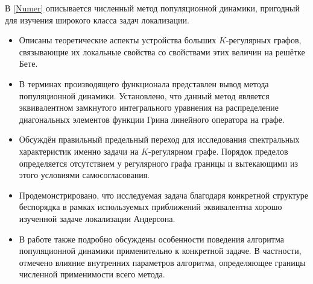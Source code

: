 В \autoref{Numer} описывается численный метод популяционной динамики, пригодный для изучения широкого класса задач локализации. 
\begin{itemize}
	\item Описаны теоретические аспекты устройства больших $K$-регулярных графов, связывающие их локальные свойства со свойствами этих величин на решётке Бете.
	\item В терминах производящего функционала представлен вывод метода популяционной динамики. Установлено, что данный метод является эквивалентном замкнутого интегрального уравнения на распределение диагональных элементов функции Грина линейного оператора на графе.
	\item Обсуждён правильный предельный переход для исследования спектральных характеристик именно задачи на $K$-регулярном графе. Порядок пределов определяется отсутствием у регулярного графа границы и вытекающими из этого условиями самосогласования.
	\item Продемонстрировано, что исследуемая задача благодаря конкретной структуре беспорядка в рамках используемых приближений эквивалентна хорошо изученной задаче локализации Андерсона.
	\item В работе также подробно обсуждены особенности поведения алгоритма популяционной динамики применительно к конкретной задаче. В частности, отмечено влияние внутренних параметров алгоритма, определяющее границы численной применимости всего метода.
\end{itemize}

